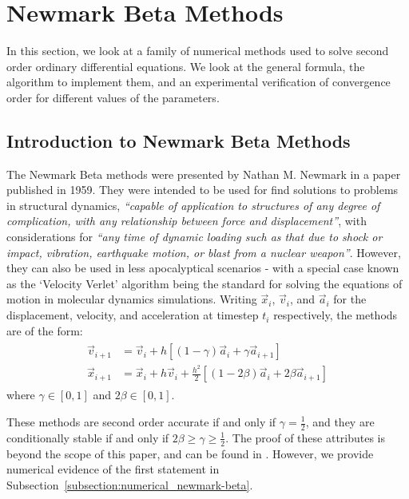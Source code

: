 \documentclass[../Main.tex]{subfiles}
\begin{document}
\section{Newmark Beta Methods}

In this  section, we look at a family of numerical methods used to solve second order ordinary differential equations. We look at the general formula, the algorithm to implement them, and an experimental verification of convergence order for different values of the parameters.

\subsection{Introduction to Newmark Beta Methods}\label{subsection:intro_newmark-beta}
The Newmark Beta methods were presented by Nathan M. Newmark in a paper \cite{Newmark1959} published in 1959. They were intended to be used for find solutions to problems in structural dynamics, \textit{``capable of application to structures of any degree of complication, with any relationship between force and displacement''}, with considerations for \textit{``any time of dynamic loading such as that due to shock or impact, vibration, earthquake motion, or blast from a nuclear weapon''}. However, they can also be used in less apocalyptical scenarios -  with a special case known as the `Velocity Verlet' algorithm being the standard for solving the equations of motion in molecular dynamics simulations.
Writing $\vec{x}_{i}$, $\vec{v}_{i}$, and $\vec{a}_{i}$ for the displacement, velocity, and acceleration at timestep $t_{i}$ respectively, the methods are of the form:
\begin{align}
	\begin{split}
		\vec{v}_{i+1} & = \vec{v}_{i} + h\left[\left(1-\gamma \right)\vec{a}_{i} + \gamma \vec{a}_{i+1}\right] \\
		\vec{x}_{i+1} & = \vec{x}_{i} + h\vec{v}_{i} + \frac{h^2}{2}\left[ \left(1-2\beta \right)\vec{a}_{i} + 2\beta \vec{a}_{i+1}\right] 
	\end{split} \label{eqn:newmark-beta}
\end{align} where $\gamma \in \left[0, 1 \right]$ and $2\beta \in \left[0, 1 \right]$.  

These methods are second order accurate if and only if $\gamma = \frac{1}{2}$, and they are conditionally stable if and only if $2\beta \geq \gamma \geq \frac{1}{2}$. The proof of these attributes is beyond the scope of this paper, and can be found in \cite{Newmark1952}. However, we provide numerical evidence of the first statement in Subsection~\ref{subsection:numerical_newmark-beta}. 
\end{document}
